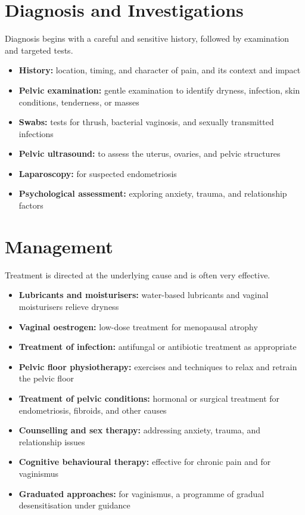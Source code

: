 \section*{Diagnosis and Investigations}
Diagnosis begins with a careful and sensitive history, followed by examination and targeted tests.
\begin{itemize}
    \item \textbf{History:} location, timing, and character of pain, and its context and impact
    \item \textbf{Pelvic examination:} gentle examination to identify dryness, infection, skin conditions, tenderness, or masses
    \item \textbf{Swabs:} tests for thrush, bacterial vaginosis, and sexually transmitted infections
    \item \textbf{Pelvic ultrasound:} to assess the uterus, ovaries, and pelvic structures
    \item \textbf{Laparoscopy:} for suspected endometriosis
    \item \textbf{Psychological assessment:} exploring anxiety, trauma, and relationship factors
\end{itemize}

\section*{Management}
Treatment is directed at the underlying cause and is often very effective.
\begin{itemize}
    \item \textbf{Lubricants and moisturisers:} water-based lubricants and vaginal moisturisers relieve dryness
    \item \textbf{Vaginal oestrogen:} low-dose treatment for menopausal atrophy
    \item \textbf{Treatment of infection:} antifungal or antibiotic treatment as appropriate
    \item \textbf{Pelvic floor physiotherapy:} exercises and techniques to relax and retrain the pelvic floor
    \item \textbf{Treatment of pelvic conditions:} hormonal or surgical treatment for endometriosis, fibroids, and other causes
    \item \textbf{Counselling and sex therapy:} addressing anxiety, trauma, and relationship issues
    \item \textbf{Cognitive behavioural therapy:} effective for chronic pain and for vaginismus
    \item \textbf{Graduated approaches:} for vaginismus, a programme of gradual desensitisation under guidance
\end{itemize}

